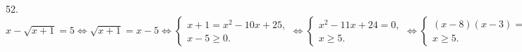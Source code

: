 52. $x-\sqrt{x+1}=5\Leftrightarrow \sqrt{x+1}=x-5\Leftrightarrow \begin{cases} x+1=x^2-10x+25,\\ x-5\geqslant0.\end{cases}
\Leftrightarrow \begin{cases} x^2-11x+24=0,\\ x\geqslant5.\end{cases}\Leftrightarrow \begin{cases} (x-8)(x-3)=0,\\ x\geqslant5.\end{cases}
\Leftrightarrow x=8.$\\
